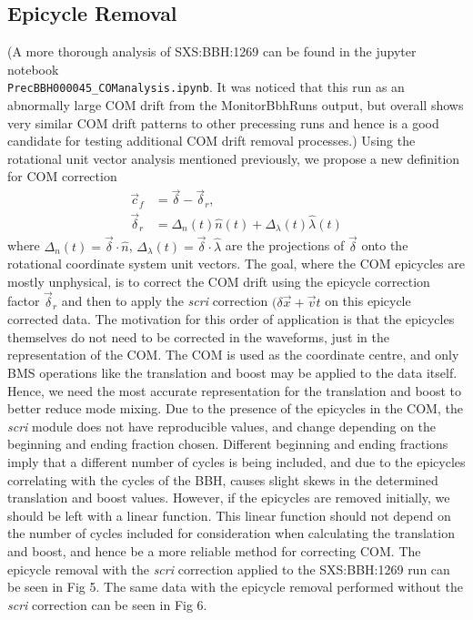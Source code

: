 \documentclass{article}
\begin{document}
\subsection{Epicycle Removal}
(A more thorough analysis of SXS:BBH:1269 can be found in the jupyter notebook \\ \texttt{PrecBBH000045\_COManalysis.ipynb}. It was noticed that this run as an abnormally large COM drift from the MonitorBbhRuns output, but overall shows very similar COM drift patterns to other precessing runs and hence is a good candidate for testing additional COM drift removal processes.)
Using the rotational unit vector analysis mentioned previously, we propose a new definition for COM correction
\begin{align}
  \vec{c}_f &= \vec{\delta} - \vec{\delta}_r, \\
  \vec{\delta}_r &= \Delta_n(t) \hat{n}(t) + \Delta_{\lambda}(t) \hat{\lambda}(t)
\end{align} 
where $\Delta_n(t) = \vec{\delta}\cdot \hat{n}$, $\Delta_{\lambda}(t) = \vec{\delta} \cdot \hat{\lambda}$ are the projections of $\vec{\delta}$ onto the rotational coordinate system unit vectors. 
The goal, where the COM epicycles are mostly unphysical, is to correct the COM drift using the epicycle correction factor $\vec{\delta}_r$ and then to apply the \textit{scri} correction $(\delta \vec{x} + \vec{v}t$ on this epicycle corrected data. The motivation for this order of application is that the epicycles themselves do not need to be corrected in the waveforms, just in the representation of the COM. The COM is used as the coordinate centre, and only BMS operations like the translation and boost may be applied to the data itself. Hence, we need the most accurate representation for the translation and boost to better reduce mode mixing. Due to the presence of the epicycles in the COM, the \textit{scri} module does not have reproducible values, and change depending on the beginning and ending fraction chosen. Different beginning and ending fractions imply that a different number of cycles is being included, and due to the epicycles correlating with the cycles of the BBH, causes slight skews in the determined translation and boost values. However, if the epicycles are removed initially, we should be left with a linear function. This linear function should not depend on the number of cycles included for consideration when calculating the translation and boost, and hence be a more reliable method for correcting COM.
The epicycle removal with the \textit{scri} correction applied to the SXS:BBH:1269 run can be seen in Fig 5. The same data with the epicycle removal performed without the \textit{scri} correction can be seen in Fig 6.
\end{document}
